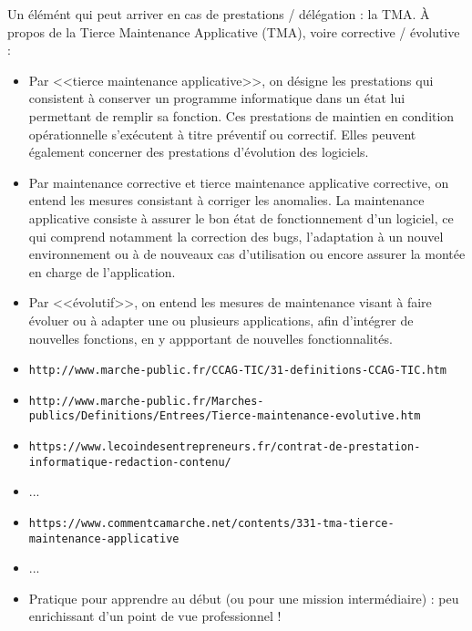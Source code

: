 \documentclass[11pt,twoside,a4paper]{article}
\begin{document}
\begin{landscape}
\begin{multicols}{2}
	Un {\'e}l{\'e}m{\'e}nt qui peut arriver en cas de prestations / d{\'e}l{\'e}gation : la TMA. {\`A} propos de la Tierce Maintenance Applicative (TMA), voire corrective / {\'e}volutive :
	\begin{itemize}
		\item Par <<tierce maintenance applicative>>, on d{\'e}signe les prestations qui consistent {\`a} conserver un programme informatique dans un {\'e}tat lui permettant de remplir sa fonction. Ces prestations de maintien en condition op{\'e}rationnelle s'ex{\'e}cutent {\`a} titre pr{\'e}ventif ou correctif. Elles peuvent {\'e}galement concerner des prestations d'{\'e}volution des logiciels.
		\item Par maintenance corrective et tierce maintenance applicative corrective, on entend les mesures consistant {\`a} corriger les anomalies. La maintenance applicative consiste {\`a} assurer le bon {\'e}tat de fonctionnement d'un logiciel, ce qui comprend notamment la correction des bugs, l'adaptation {\`a} un nouvel environnement ou {\`a} de nouveaux cas d'utilisation ou encore assurer la mont{\'e}e en charge de l'application. 
		\item Par <<{\'e}volutif>>, on entend les mesures de maintenance visant {\`a} faire {\'e}voluer ou {\`a} adapter une ou plusieurs applications, afin d'int{\'e}grer de nouvelles fonctions, en y appportant de nouvelles fonctionnalit{\'e}s.
		\item \texttt{http://www.marche-public.fr/CCAG-TIC/31-definitions-CCAG-TIC.htm}
		\item \texttt{http://www.marche-public.fr/Marches-publics/Definitions/Entrees/Tierce-maintenance-evolutive.htm}
		\item \texttt{https://www.lecoindesentrepreneurs.fr/contrat-de-prestation-informatique-redaction-contenu/}
		\item ... 
		\item \texttt{https://www.commentcamarche.net/contents/331-tma-tierce-maintenance-applicative}
		\item ... 
		\item Pratique pour apprendre au d{\'e}but (ou pour une mission interm{\'e}diaire) : peu enrichissant d'un point de vue professionnel !
	\end{itemize}
\end{multicols}

\clearpage

\end{landscape}
\end{document}
